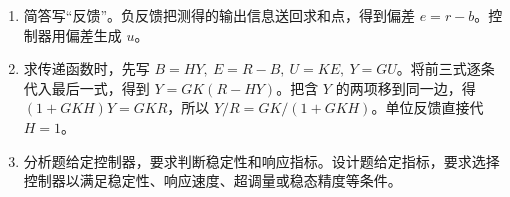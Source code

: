 
\sol
\begin{enumerate}[leftmargin=*]
    \item 简答写“反馈”。负反馈把测得的输出信息送回求和点，得到偏差 $e=r-b$。控制器用偏差生成 $u$。
    \item 求传递函数时，先写 $B=HY,\ E=R-B,\ U=KE,\ Y=GU$。将前三式逐条代入最后一式，得到 $Y=GK(R-HY)$。把含 $Y$ 的两项移到同一边，得 $(1+GKH)Y=GKR$，所以 $Y/R=GK/(1+GKH)$。单位反馈直接代 $H=1$。
    \item 分析题给定控制器，要求判断稳定性和响应指标。设计题给定指标，要求选择控制器以满足稳定性、响应速度、超调量或稳态精度等条件。
\end{enumerate}
